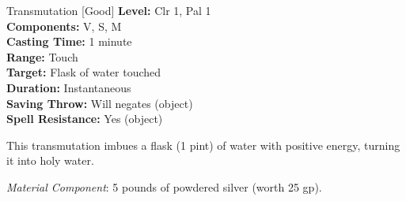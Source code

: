 {Transmutation [Good]}
{
	\textbf{Level:}
	Clr 1, Pal 1\\
	\textbf{Components:}
	V, S, M\\
	\textbf{Casting Time:}
	1 minute\\
	\textbf{Range:}
	Touch\\
	\textbf{Target:}
	Flask of water touched\\
	\textbf{Duration:}
	Instantaneous\\
	\textbf{Saving Throw:}
	Will negates (object)\\
	\textbf{Spell Resistance:}
	Yes (object)\\
}
{
	This transmutation imbues a flask (1 pint) of water with positive energy, turning it into holy water.

	\textit{Material Component}:
	5 pounds of powdered silver (worth 25 gp).

}
